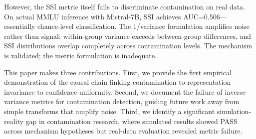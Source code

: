 However, the SSI metric itself fails to discriminate contamination on real data. On actual MMLU inference with Mistral-7B, SSI achieves AUC=0.506---essentially chance-level classification. The 1/variance formulation amplifies noise rather than signal: within-group variance exceeds between-group differences, and SSI distributions overlap completely across contamination levels. The mechanism is validated; the metric formulation is inadequate.

This paper makes three contributions. First, we provide the first empirical demonstration of the causal chain linking contamination to representation invariance to confidence uniformity. Second, we document the failure of inverse-variance metrics for contamination detection, guiding future work away from simple transforms that amplify noise. Third, we identify a significant simulation-reality gap in contamination research, where simulated results showed PASS across mechanism hypotheses but real-data evaluation revealed metric failure.
